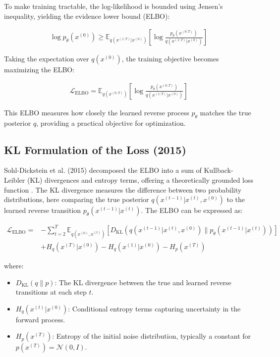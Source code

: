 \documentclass[12pt]{article}
\begin{document}
To make training tractable, the log-likelihood is bounded using Jensen’s inequality, yielding the evidence lower bound (ELBO):

\begin{align}
\log p_\theta(x^{(0)}) \geq \mathbb{E}_{q(x^{(1:T)} | x^{(0)})} \left[ \log \frac{p_\theta(x^{(0:T)})}{q(x^{(1:T)} | x^{(0)})} \right]
\end{align}

Taking the expectation over \( q(x^{(0)}) \), the training objective becomes maximizing the ELBO:

\begin{align}
\mathcal{L}_{\text{ELBO}} = \mathbb{E}_{q(x^{(0:T)})} \left[ \log \frac{p_\theta(x^{(0:T)})}{q(x^{(1:T)} | x^{(0)})} \right]
\end{align}

This ELBO measures how closely the learned reverse process \( p_\theta \) matches the true posterior \( q \), providing a practical objective for optimization.

\subsection{KL Formulation of the Loss (2015)}
\label{subsec:kl_2015}

Sohl-Dickstein et al. (2015) decomposed the ELBO into a sum of Kullback-Leibler (KL) divergences and entropy terms, offering a theoretically grounded loss function \cite{sohl2015}. The KL divergence measures the difference between two probability distributions, here comparing the true posterior \( q(x^{(t-1)} | x^{(t)}, x^{(0)}) \) to the learned reverse transition \( p_\theta(x^{(t-1)} | x^{(t)}) \). The ELBO can be expressed as:

\begin{align}
\mathcal{L}_{\text{ELBO}} = & - \sum_{t=2}^{T} \mathbb{E}_{q(x^{(0)}, x^{(t)})} \left[ 
    D_{\text{KL}} \left( q(x^{(t-1)} | x^{(t)}, x^{(0)}) \parallel p_\theta(x^{(t-1)} | x^{(t)}) \right) 
\right] \nonumber \\
& + H_q(x^{(T)} | x^{(0)}) - H_q(x^{(1)} | x^{(0)}) - H_p(x^{(T)})
\end{align}


where:
\begin{itemize}
    \item \( D_{\text{KL}}(q \parallel p) \): The KL divergence between the true and learned reverse transitions at each step \( t \).
    \item \( H_q(x^{(t)} | x^{(0)}) \): Conditional entropy terms capturing uncertainty in the forward process.
    \item \( H_p(x^{(T)}) \): Entropy of the initial noise distribution, typically a constant for \( p(x^{(T)}) = \mathcal{N}(0, I) \).
\end{itemize}
\end{document}
